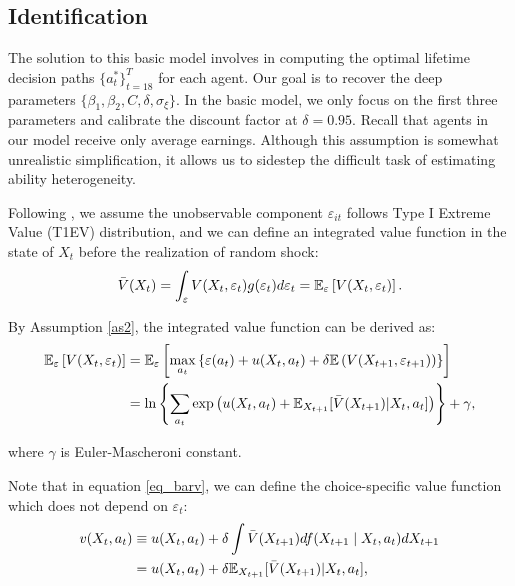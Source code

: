 \documentclass[a4paper, 12pt]{article}
\begin{document}
\subsection{Identification}
The solution to this basic model involves in computing the optimal lifetime decision paths $\{a_t^*\}^T_{t=18}$ for each agent.
Our goal is to recover the deep parameters $\{\beta_1, \beta_2, C, \delta, \sigma_{\xi} \}.$
In the basic model, we only focus on the first three parameters and calibrate the discount factor at $\delta = 0.95$. 
Recall that agents in our model receive only average earnings. 
Although this assumption is somewhat unrealistic simplification, 
it allows us to sidestep the difficult task of estimating ability heterogeneity.

Following \cite{rust1987optimal}, we assume the unobservable component $\varepsilon_{it}$ follows Type I Extreme Value (T1EV) distribution, 
and we can define an integrated value function in the state of $X_{t}$ before the realization of random shock:
\begin{equation}
\Bar{V}(X_t) = \int_\varepsilon V(X_t,\varepsilon_t)g(\varepsilon_t) d\varepsilon_t = \mathbb{E}_\varepsilon \left[ V(X_t, \varepsilon_t) \right] .
\end{equation}

By Assumption \eqref{as2}, the integrated value function can be derived as:
\begin{equation}
\label{eq_barv}
\begin{split}
\mathbb{E}_\varepsilon \left[ V(X_t, \varepsilon_t) \right] &= \mathbb{E}_\varepsilon \left[ \max_{a_t} \left\{ \varepsilon(a_t) + u(X_t, a_t) + \delta \mathbb{E}\left(V(X_{t+1}, \varepsilon_{t+1}) \right)\right\} \right]\\
&= \ln \left\{ \sum_{a_t} \exp \left( u(X_t, a_t) +\mathbb{E}_{X_{t+1}} [\Bar{V}(X_{t+1})|X_{t}, a_t] \right) \right\} + \gamma,
\end{split}
\end{equation}

where $\gamma$ is Euler-Mascheroni constant.

Note that in equation \eqref{eq_barv}, we can define the choice-specific value function which does not depend on $\varepsilon_t$:
\begin{equation}
\begin{split}
v(X_{t}, a_t) &\equiv u(X_t, a_t) + \delta\int \Bar{V}(X_{t+1}) df(X_{t+1} \mid X_{t}, a_t)dX_{t+1}\\
&= u(X_{t}, a_{t}) + \delta \mathbb{E}_{X_{t+1}} [\Bar{V}(X_{t+1})|X_{t}, a_t],
\end{split}
\end{equation}
\end{document}
